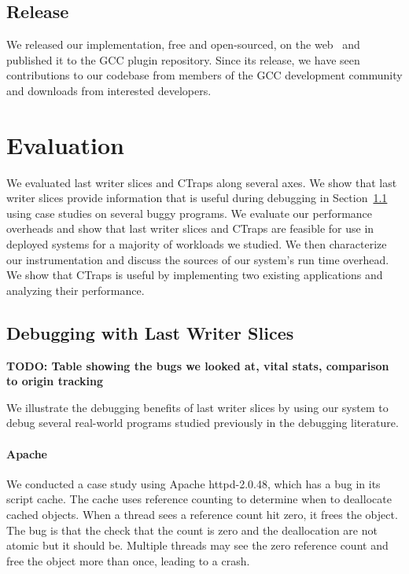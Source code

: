 \documentclass[preprint,9pt]{sigplanconf}
\newcommand{\ctraps}{CTraps\xspace}
\begin{document}
\subsection{Release}
We released our implementation, free and open-sourced, on the
web~\cite{withheldforanonymity} and published it to the GCC plugin repository.
Since its release, we have seen contributions to our codebase from members of
the GCC development community and downloads from interested developers.

\section{Evaluation}
\label{sec:eval}
We evaluated last writer slices and \ctraps along several axes.  We show that
last writer slices provide information that is useful during debugging in
Section~\ref{sec:eval:debugging} using case studies on several buggy programs.
We evaluate our performance overheads and show that last writer slices and
\ctraps are feasible for use in deployed systems for a majority of workloads we
studied.  We then characterize our instrumentation and discuss the sources of
our system's run time overhead.   We show that \ctraps is useful by
implementing two existing applications and analyzing their performance.    

\subsection{Debugging with Last Writer Slices}
\label{sec:eval:debugging}

{\bf TODO: Table showing the bugs we looked at, vital stats, comparison to origin tracking}

We illustrate the debugging benefits of last writer slices by using our system
to debug several real-world programs studied previously in the debugging
literature.    

\paragraph{Apache}
We conducted a case study using Apache httpd-2.0.48, which has a bug in its
script cache. The cache uses reference counting to determine when to deallocate
cached objects.  When a thread sees a reference count hit zero, it frees the
object.  The bug is that the check that the count is zero and the deallocation
are not atomic but it should be.  Multiple threads may see the zero reference
count and free the object more than once, leading to a crash. 
\end{document}
